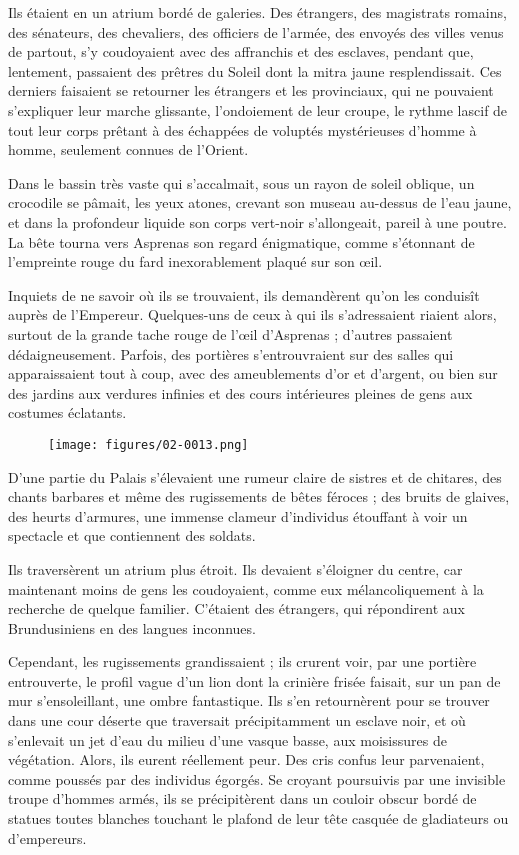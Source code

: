 \documentclass[a4paper, 11pt, oneside, polutonikogreek, french]{article}
\begin{document}
Ils étaient en un atrium bordé de galeries. Des étrangers, des magistrats romains, des sénateurs, des chevaliers, des officiers de l'armée, des envoyés des villes venus de partout, s'y coudoyaient avec des affranchis et des esclaves, pendant que, lentement, passaient des prêtres du Soleil dont la mitra jaune resplendissait. Ces derniers faisaient se retourner les étrangers et les provinciaux, qui ne pouvaient s'expliquer leur marche glissante, l'ondoiement de leur croupe, le rythme lascif de tout leur corps prêtant à des échappées de voluptés mystérieuses d'homme à homme, seulement connues de l'Orient.

Dans le bassin très vaste qui s'accalmait, sous un rayon de soleil oblique, un crocodile se pâmait, les yeux atones, crevant son museau au-dessus de l'eau jaune, et dans la profondeur liquide son corps vert-noir s'allongeait, pareil à une poutre. La bête tourna vers Asprenas son regard énigmatique, comme s'étonnant de l'empreinte rouge du fard inexorablement plaqué sur son œil.

Inquiets de ne savoir où ils se trouvaient, ils demandèrent qu'on les conduisît auprès de l'Empereur. Quelques-uns de ceux à qui ils s'adressaient riaient alors, surtout de la grande tache rouge de l'œil d'Asprenas ; d'autres passaient dédaigneusement. Parfois, des portières s'entrouvraient sur des salles qui apparaissaient tout à coup, avec des ameublements d'or et d'argent, ou bien sur des jardins aux verdures infinies et des cours intérieures pleines de gens aux costumes éclatants.
\begin{figure}[H]
\centering
\texttt{[image: figures/02-0013.png]}
\end{figure}
D'une partie du Palais s'élevaient une rumeur claire de sistres et de chitares, des chants barbares et même des rugissements de bêtes féroces ; des bruits de glaives, des heurts d'armures, une immense clameur d'individus étouffant à voir un spectacle et que contiennent des soldats.

Ils traversèrent un atrium plus étroit. Ils devaient s'éloigner du centre, car maintenant moins de gens les coudoyaient, comme eux mélancoliquement à la recherche de quelque familier. C'étaient des étrangers, qui répondirent aux Brundusiniens en des langues inconnues.

Cependant, les rugissements grandissaient ; ils crurent voir, par une portière entrouverte, le profil vague d'un lion dont la crinière frisée faisait, sur un pan de mur s'ensoleillant, une ombre fantastique. Ils s'en retournèrent pour se trouver dans une cour déserte que traversait précipitamment un esclave noir, et où s'enlevait un jet d'eau du milieu d'une vasque basse, aux moisissures de végétation. Alors, ils eurent réellement peur. Des cris confus leur parvenaient, comme poussés par des individus égorgés. Se croyant poursuivis par une invisible troupe d'hommes armés, ils se précipitèrent dans un couloir obscur bordé de statues toutes blanches touchant le plafond de leur tête casquée de gladiateurs ou d'empereurs.
\end{document}
